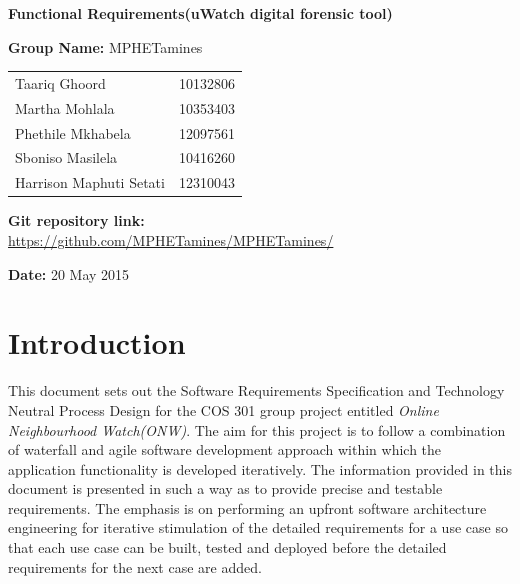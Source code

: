 \documentclass[a4paper,12pt]{article}
\begin{document}
\begin{center}

\Huge\textbf{Functional Requirements(uWatch digital forensic tool)\\}
																											
\vspace{2 cm}

\LARGE\textbf{Group Name:} MPHETamines\newline
 
 
 
 
 
\vspace{0.5 cm}
\begin{tabular}{lr}
Taariq Ghoord&10132806
\\ 
Martha Mohlala&10353403
\\
Phethile Mkhabela&12097561
\\
Sboniso Masilela&10416260
\\
Harrison Maphuti Setati&12310043\\
\end{tabular}

\vspace{1cm}
\textbf{Git repository link:\\}
\url{https://github.com/MPHETamines/MPHETamines/}

\vspace{1cm}
\textbf{Date:} 20 May 2015
\end{center}
\newpage

\tableofcontents







\newpage
{}

\section{Introduction}
This document sets out the Software Requirements Specification and Technology Neutral Process Design for the COS 301 group project entitled \textit{Online Neighbourhood Watch(ONW)}.
The aim for this project is to follow a combination of waterfall and agile software development approach within which the application functionality is developed 
iteratively. 
The information provided in this document is presented in such a way as to provide precise and testable requirements. The emphasis is on performing an upfront software 
architecture engineering for iterative stimulation of the detailed requirements for a use case so that each use case can be built, tested and deployed before the detailed 
requirements for the next case are added.
\end{document}
